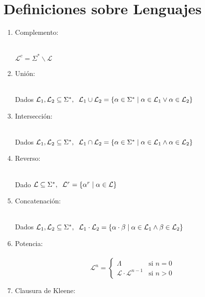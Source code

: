 \documentclass[12pt]{article}
\begin{document}
\section{Definiciones sobre Lenguajes}
\renewcommand\labelenumi{(\theenumi)}
\begin{enumerate}
    \item {Complemento:}
    \\
    \\
    \centerline{$\mathcal{L}^c=\Sigma^*\backslash\mathcal{L}$}
    \item {Unión:}
    \\
    \\
    \centerline{Dados $\mathcal{L}_1,\mathcal{L}_2 \subseteq \Sigma^*, \hspace{0.2cm} \mathcal{L}_1\cup\mathcal{L}_2 = \{\alpha \in \Sigma^* \mid \alpha \in \mathcal{L}_1\lor \alpha \in \mathcal{L}_2\}$}
    \item {Intersección:}
    \\
    \\
    \centerline{Dados $\mathcal{L}_1,\mathcal{L}_2 \subseteq \Sigma^*, \hspace{0.2cm} \mathcal{L}_1\cap\mathcal{L}_2 = \{\alpha \in \Sigma^* \mid \alpha \in \mathcal{L}_1\land \alpha \in \mathcal{L}_2\}$}
    \item {Reverso:}
    \\
    \\
    \centerline{Dado $\mathcal{L} \subseteq \Sigma^*,\hspace{0.2cm} \mathcal{L}^r= \{\alpha^r \mid \alpha \in \mathcal{L}\}$}
    \item {Concatenación:}
    \\
    \\
    \centerline{Dados $\mathcal{L}_1,\mathcal{L}_2 \subseteq \Sigma^*,\hspace{0.2cm} \mathcal{L}_1\cdot\mathcal{L}_2= \{\alpha \cdot \beta \mid \alpha \in \mathcal{L}_1 \land \beta \in \mathcal{L}_2\}$}
    \item {Potencia:}
    \\
    \\
    \[
    \mathcal{L}^n =
    \begin{cases} 
    \Lambda & \text{si } n = 0 \\
    \mathcal{L}\cdot\mathcal{L}^{n-1} & \text{si } n > 0
    \end{cases}
    \]
    \item {Clausura de Kleene:}
    \\
    \\

\end{enumerate}
\end{document}
